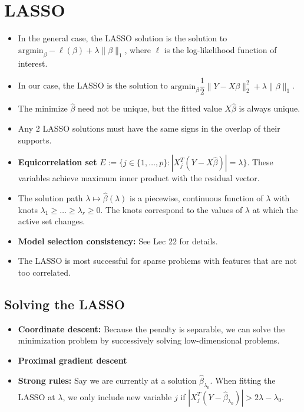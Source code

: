 \documentclass[twoside]{article}
\newcommand\lmb{\lambda}
\begin{document}
\section{LASSO}
\begin{itemize}
\item In the general case, the LASSO solution is the solution to $\text{argmin}_{\beta} -\ell(\beta) + \lmb \| \beta\|_1$, where $\ell$ is the log-likelihood function of interest.

\item In our case, the LASSO is the solution to $\text{argmin}_{\beta} \dfrac{1}{2}\|Y - X\beta\|_2^2 + \lmb \| \beta\|_1$.

\item The minimize $\hat{\beta}$ need not be unique, but the fitted value $X \hat{\beta}$ is always unique.

\item Any 2 LASSO solutions must have the same signs in the overlap of their supports.

\item \textbf{Equicorrelation set} $E := \{ j \in \{1, \dots, p \}: |X_j^T(Y - X\hat{\beta})| = \lmb \}.$ These variables achieve maximum inner product with the residual vector.

\item The solution path $\lmb \mapsto \hat{\beta}(\lmb)$ is a piecewise, continuous function of $\lmb$ with knots $\lmb_1 \geq \dots \geq \lmb_r \geq 0$. The knots correspond to the values of $\lmb$ at which the active set changes.

\item \textbf{Model selection consistency:} See Lec 22 for details.

\item The LASSO is most successful for sparse problems with features that are not too correlated.
\end{itemize}

\subsection{Solving the LASSO}
\begin{itemize}
\item \textbf{Coordinate descent:} Because the penalty is separable, we can solve the minimization problem by successively solving low-dimensional problems. 
\item \textbf{Proximal gradient descent}

\item \textbf{Strong rules:} Say we are currently at a solution $\hat{\beta}_{\lmb_0}$. When fitting the LASSO at $\lmb$, we only include new variable $j$ if $|X_j^T(Y - \hat{\beta}_{\lmb_0})| > 2\lmb - \lmb_0$.
\end{itemize}
\end{document}
